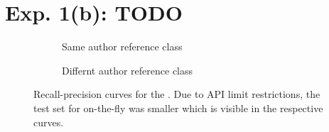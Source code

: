 \section{Exp. 1(b): TODO}

\begin{figure}[htbp]
  \centering
  \begin{subfigure}[b]{0.495\textwidth}
    \centering
    
    \caption{Same author reference class}
    \label{fig:student_essays_same_author}
  \end{subfigure}

  \hfill
  \begin{subfigure}[b]{0.495\textwidth}
    \centering
    
    \caption{Differnt author reference class}
    \label{fig:student_essays_different_author}
  \end{subfigure}
\caption{Recall-precision curves for the \dataStudent{}. 
Due to API limit restrictions, the test set for on-the-fly was smaller which is visible in the respective curves.}
  \label{fig:diff_imp_gen_student_essays}
\end{figure}